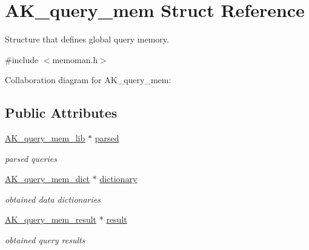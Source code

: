 \hypertarget{structAK__query__mem}{}\section{A\+K\+\_\+query\+\_\+mem Struct Reference}
\label{structAK__query__mem}


Structure that defines global query memory.  




{\ttfamily \#include $<$memoman.\+h$>$}



Collaboration diagram for A\+K\+\_\+query\+\_\+mem\+:
\subsection*{Public Attributes}
\begin{DoxyCompactItemize}
\item 
\hyperlink{structAK__query__mem__lib}{A\+K\+\_\+query\+\_\+mem\+\_\+lib} $\ast$ \hyperlink{structAK__query__mem_a3b5ffb6f531f7f0a6821f3d643bd55db}{parsed}\hypertarget{structAK__query__mem_a3b5ffb6f531f7f0a6821f3d643bd55db}{}\label{structAK__query__mem_a3b5ffb6f531f7f0a6821f3d643bd55db}

\begin{DoxyCompactList}\small\item\em parsed queries \end{DoxyCompactList}\item 
\hyperlink{structAK__query__mem__dict}{A\+K\+\_\+query\+\_\+mem\+\_\+dict} $\ast$ \hyperlink{structAK__query__mem_ac75fcb9c9e74444239b7fa9862ce3ffe}{dictionary}\hypertarget{structAK__query__mem_ac75fcb9c9e74444239b7fa9862ce3ffe}{}\label{structAK__query__mem_ac75fcb9c9e74444239b7fa9862ce3ffe}

\begin{DoxyCompactList}\small\item\em obtained data dictionaries \end{DoxyCompactList}\item 
\hyperlink{structAK__query__mem__result}{A\+K\+\_\+query\+\_\+mem\+\_\+result} $\ast$ \hyperlink{structAK__query__mem_ac9e0f1fb8381c15b83051bb9f520d703}{result}\hypertarget{structAK__query__mem_ac9e0f1fb8381c15b83051bb9f520d703}{}\label{structAK__query__mem_ac9e0f1fb8381c15b83051bb9f520d703}

\begin{DoxyCompactList}\small\item\em obtained query results \end{DoxyCompactList}\end{DoxyCompactItemize}


